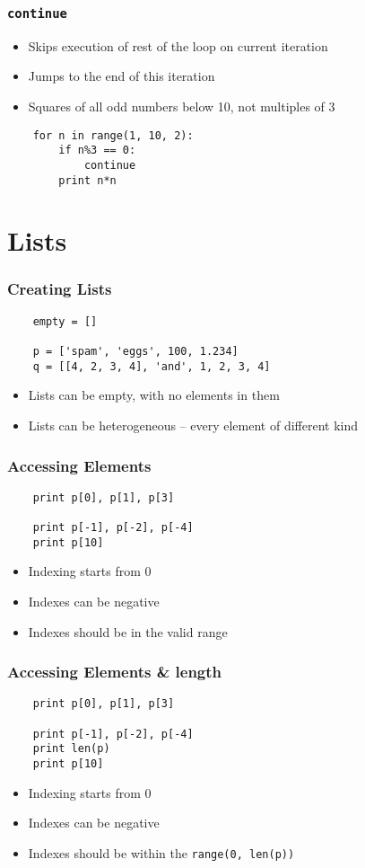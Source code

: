 \begin{frame}[fragile]
  \frametitle{\texttt{continue}}
  \begin{itemize}
  \item Skips execution of rest of the loop on current iteration
  \item Jumps to the end of this iteration
  \item Squares of all odd numbers below 10, not multiples of 3
  \end{itemize}
  \begin{lstlisting}
    for n in range(1, 10, 2):
        if n%3 == 0:
            continue      
        print n*n
  \end{lstlisting}
\end{frame}


\section{Lists}

\begin{frame}[fragile]
  \frametitle{Creating Lists}
  \begin{lstlisting}
    empty = [] 

    p = ['spam', 'eggs', 100, 1.234]
    q = [[4, 2, 3, 4], 'and', 1, 2, 3, 4]
  \end{lstlisting}
  \begin{itemize}
  \item Lists can be empty, with no elements in them
  \item Lists can be heterogeneous -- every element of different kind
  \end{itemize}
\end{frame}

\begin{frame}[fragile]
  \frametitle{Accessing Elements}
  \begin{lstlisting}
    print p[0], p[1], p[3]

    print p[-1], p[-2], p[-4]
    print p[10]
  \end{lstlisting}
  \begin{itemize}
  \item Indexing starts from 0
  \item Indexes can be negative
  \item Indexes should be in the valid range
  \end{itemize}
\end{frame}

\begin{frame}[fragile]
  \frametitle{Accessing Elements \& length}
  \begin{lstlisting}
    print p[0], p[1], p[3]

    print p[-1], p[-2], p[-4]
    print len(p)
    print p[10]
  \end{lstlisting}
  \begin{itemize}
  \item Indexing starts from 0
  \item Indexes can be negative
  \item Indexes should be within the \texttt{range(0, len(p))}
  \end{itemize}
\end{frame}


